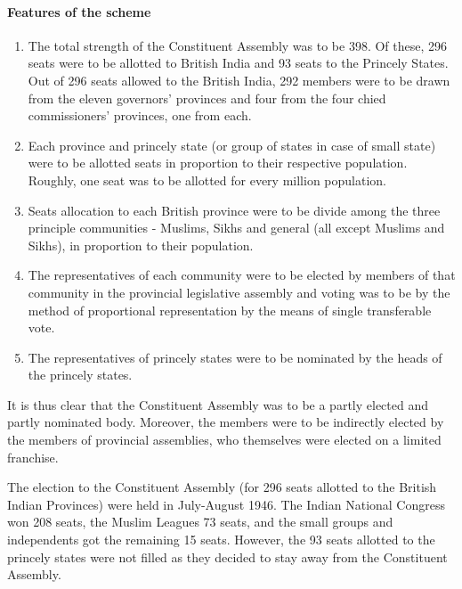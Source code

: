 \begin{multicols}{2}
\paragraph{Features of the scheme}
\begin{enumerate}
  \item The total strength of the Constituent Assembly was to be 398. Of these, 296 seats were to be allotted to British India and 93 seats to the Princely States. Out of 296 seats allowed to the British India, 292 members were to be drawn from the eleven governors' provinces and four from the four chied commissioners' provinces, one from each.
  \item Each province and princely state (or group of states in case of small state) were to be allotted seats in proportion to their respective population. Roughly, one seat was to be allotted for every million population.
  \item Seats allocation to each British province were to be divide among the three principle communities - Muslims, Sikhs and general (all except Muslims and Sikhs), in proportion to their population.
  \item The representatives of each community were to be elected by members of that community in the provincial legislative assembly and voting was to be by the method of proportional representation by the means of single transferable vote.
  \item The representatives of princely states were to be nominated by the heads of the princely states.
\end{enumerate}

It is thus clear that the Constituent Assembly was to be a partly elected and partly nominated body. Moreover, the members were to be indirectly elected by the members of provincial assemblies, who themselves were elected on a limited franchise.

The election to the Constituent Assembly (for 296 seats allotted to the British Indian Provinces) were held in July-August 1946. The Indian National Congress won 208 seats, the Muslim Leagues 73 seats, and the small groups and independents got the remaining 15 seats. However, the 93 seats allotted to the princely states were not filled as they decided to stay away from the Constituent Assembly.


\end{multicols}

